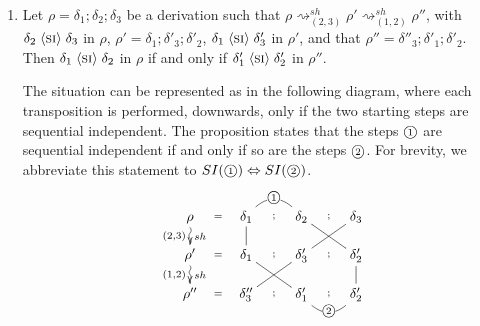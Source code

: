 \documentclass{llncs}
\newcommand{\cycl}[1]{\ensuremath{\mbox{\textcircled{\scriptsize{$#1$}}}}}
\renewcommand{\iff}{\ensuremath{\Leftrightarrow}}
\newcommand{\shiftdir}[1][]{\ensuremath{\mathrel{{\rightsquigarrow}^{\mathit{sh}}_{#1}}}}
\begin{document}
\begin{lemma}
\label{le:invariance-immediate}
\begin{enumerate}

\item Let $\rho = \delta_1 ; \delta_2 ; \delta_3 $ be a derivation such that $\rho \shiftdir[(2,3)] \rho'  \shiftdir[(1,2)] \rho''$,  with $\delta_2 \mathrel{\langle \mbox{\textsc{si}}\rangle} \delta_3$ in $\rho$, $\rho' = \delta_1 ; \delta'_3 ; \delta'_2$,   $\delta_1 \mathrel{\langle \mbox{\textsc{si}}\rangle} \delta'_3$ in $\rho'$, and that $\rho'' =  \delta''_3 ; \delta'_1 ; \delta'_2$. 
Then $\delta_1 \mathrel{\langle \mbox{\textsc{si}}\rangle} \delta_2$ in $\rho$ if and only if  $\delta'_1 \mathrel{\langle \mbox{\textsc{si}}\rangle} \delta'_2$ in $\rho''$. 

The situation can be represented as in the following diagram, where each transposition is performed, downwards, only if the two starting steps are sequential independent. The proposition states that the steps \cycl{1} are sequential independent if and only if so are the steps \cycl{2}. For brevity, we abbreviate this statement to $SI(\cycl{1}) \iff SI(\cycl{2})$.


$$\xymatrix@C=2pc@R=1pc{
 \rho  \ar@{~>}[d]^{sh}_{(2,3)}  \ar@{}[r]|{=} &  \delta_1 \ar@{-}[d]  \ar@{}[r]|{;}  \ar@{-}@/^3ex/[r]|{\cycl{1}} & \delta_2 \ar@{-}[dr]  \ar@{}[r]|{;} & \delta_3 \ar@{-}[dl] \\
\rho'  \ar@{~>}[d]^{sh}_{(1,2)}  \ar@{}[r]|{=} &   \delta_1 \ar@{-}[dr]  \ar@{}[r]|{;} & \delta'_3 \ar@{-}[dl]  \ar@{}[r]|{;} & \delta'_2 \ar@{-}[d]\\
\rho''  \ar@{}[r]|{=} &    \delta''_3 \ar@{}[r]|{;} & \delta'_1 \ar@{-}@/_3ex/[r]|{\cycl{2}} \ar@{}[r]|{;} & \delta'_2  \\
}$$





\end{enumerate}
\end{lemma}
\end{document}
